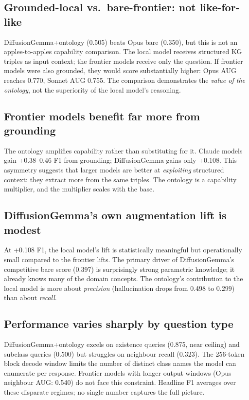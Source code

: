 \documentclass[11pt]{article}
\begin{document}
\begin{samepage}
\subsection{Grounded-local vs.\ bare-frontier: not like-for-like}
DiffusionGemma+ontology (0.505) beats Opus bare (0.350), but this is not an apples-to-apples
capability comparison. The local model receives structured KG triples as input context; the
frontier models receive only the question. If frontier models were also grounded, they would
score substantially higher: Opus AUG reaches 0.770, Sonnet AUG 0.755. The comparison
demonstrates the \emph{value of the ontology}, not the superiority of the local model's
reasoning.
\end{samepage}

\begin{samepage}
\subsection{Frontier models benefit far more from grounding}
The ontology amplifies capability rather than substituting for it. Claude models gain
+0.38--0.46 F1 from grounding; DiffusionGemma gains only +0.108. This asymmetry suggests that
larger models are better at \emph{exploiting} structured context: they extract more from the
same triples. The ontology is a capability multiplier, and the multiplier scales with the base.
\end{samepage}

\begin{samepage}
\subsection{DiffusionGemma's own augmentation lift is modest}
At +0.108 F1, the local model's lift is statistically meaningful but operationally small compared
to the frontier lifts. The primary driver of DiffusionGemma's competitive bare score (0.397) is
surprisingly strong parametric knowledge; it already knows many of the domain concepts. The
ontology's contribution to the local model is more about \emph{precision} (hallucination drops
from 0.498 to 0.299) than about \emph{recall}.
\end{samepage}

\begin{samepage}
\subsection{Performance varies sharply by question type}
DiffusionGemma+ontology excels on existence queries (0.875, near ceiling) and subclass queries
(0.500) but struggles on neighbour recall (0.323). The 256-token block decode window limits the
number of distinct class names the model can enumerate per response. Frontier models with longer
output windows (Opus neighbour AUG: 0.540) do not face this constraint. Headline F1 averages
over these disparate regimes; no single number captures the full picture.
\end{samepage}
\end{document}
